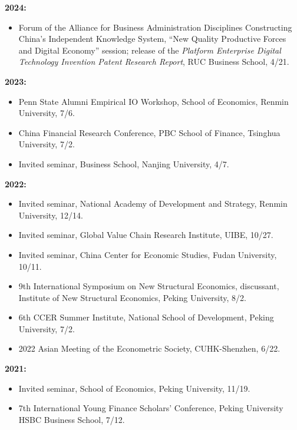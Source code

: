 \documentclass[letterpaper]{article}
\begin{document}
\textbf{2024:}
\begin{itemize}[leftmargin=1.6em, itemsep=0.25em, topsep=0.2em]
  \item Forum of the Alliance for Business Administration Disciplines Constructing China's Independent Knowledge System, ``New Quality Productive Forces and Digital Economy'' session; release of the \textit{Platform Enterprise Digital Technology Invention Patent Research Report}, RUC Business School, 4/21.
\end{itemize}

\textbf{2023:}
\begin{itemize}[leftmargin=1.6em, itemsep=0.25em, topsep=0.2em]
  \item Penn State Alumni Empirical IO Workshop, School of Economics, Renmin University, 7/6.
  \item China Financial Research Conference, PBC School of Finance, Tsinghua University, 7/2.
  \item Invited seminar, Business School, Nanjing University, 4/7.
\end{itemize}

\textbf{2022:}
\begin{itemize}[leftmargin=1.6em, itemsep=0.25em, topsep=0.2em]
  \item Invited seminar, National Academy of Development and Strategy, Renmin University, 12/14.
  \item Invited seminar, Global Value Chain Research Institute, UIBE, 10/27.
  \item Invited seminar, China Center for Economic Studies, Fudan University, 10/11.
  \item 9th International Symposium on New Structural Economics, discussant, Institute of New Structural Economics, Peking University, 8/2.
  \item 6th CCER Summer Institute, National School of Development, Peking University, 7/2.
  \item 2022 Asian Meeting of the Econometric Society, CUHK-Shenzhen, 6/22.
\end{itemize}

\textbf{2021:}
\begin{itemize}[leftmargin=1.6em, itemsep=0.25em, topsep=0.2em]
  \item Invited seminar, School of Economics, Peking University, 11/19.
  \item 7th International Young Finance Scholars' Conference, Peking University HSBC Business School, 7/12.
\end{itemize}
\end{document}
